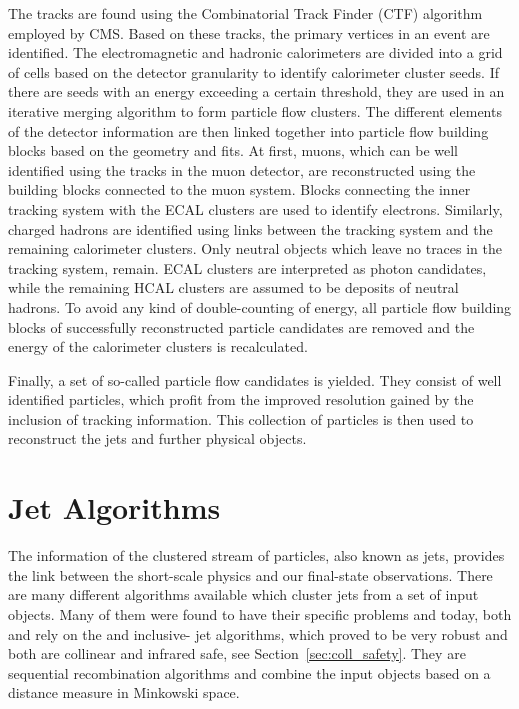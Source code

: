 The tracks are found using the Combinatorial Track Finder (CTF)
algorithm~\cite{Adam:2005cg} employed by CMS. Based on these tracks, the primary
vertices in an event are identified. The electromagnetic and hadronic
calorimeters are divided into a grid of cells based on the detector granularity
to identify calorimeter cluster seeds. If there are seeds with an energy
exceeding a certain threshold, they are used in an iterative merging algorithm
to form particle flow clusters. The different elements of the detector
information are then linked together into particle flow building blocks based on
the geometry and \chisq fits. At first, muons, which can be well identified
using the tracks in the muon detector, are reconstructed using the building
blocks connected to the muon system. Blocks connecting the inner
tracking system with the ECAL clusters are used to identify electrons.
Similarly, charged hadrons are identified using links between the
tracking system and the remaining calorimeter clusters. Only neutral objects
which leave no traces in the tracking system, remain. ECAL clusters are
interpreted as photon candidates, while the remaining HCAL clusters are assumed
to be deposits of neutral hadrons. To avoid any kind of double-counting of
energy, all particle flow building blocks of successfully reconstructed particle
candidates are removed and the energy of the calorimeter clusters is recalculated.

Finally, a set of so-called particle flow candidates is yielded. They consist of
well identified particles, which profit from the improved resolution gained by
the inclusion of tracking information. This collection of particles is then
used to reconstruct the jets and further physical objects.


\section{Jet Algorithms}
\label{sec:jet_algorithms}

The information of the clustered stream of particles, also known as jets,
provides the link between the short-scale physics and our final-state
observations. There are many different algorithms available which cluster jets
from a set of input objects. Many of them were found to have their specific
problems and today, both \CMS and \ATLAS rely on the \antikt and inclusive-\kt
jet algorithms, which proved to be very robust and both are collinear and
infrared safe, see Section~\ref{sec:coll_safety}.  They are sequential
recombination algorithms and combine the input objects based on a distance
measure in Minkowski space.

